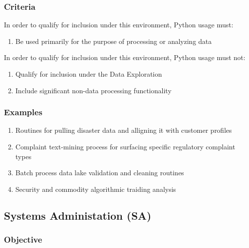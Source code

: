 		\subsubsection{Criteria}

			In order to qualify for inclusion under this environment, Python usage must:

			\begin{enumerate}
                \item Be used primarily for the purpose of processing or analyzing data
        	\end{enumerate}

			In order to qualify for inclusion under this environment, Python usage must not:

			\begin{enumerate}
        		\item Qualify for inclusion under the Data Exploration
                \item Include significant non-data processing functionality
        	\end{enumerate}

		\subsubsection{Examples}

			\begin{enumerate}
        		\item Routines for pulling disaster data and alligning it with customer profiles
        		\item Complaint text-mining process for surfacing specific regulatory complaint types
        		\item Batch process data lake validation and cleaning routines
                \item Security and commodity algorithmic traiding analysis
        	\end{enumerate}


	\subsection{Systems Administation (SA)}

		\subsubsection{Objective}

